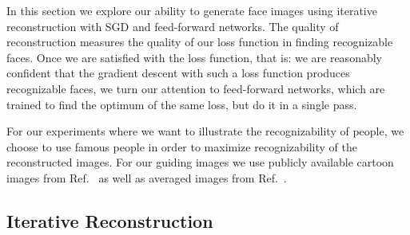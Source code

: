 \documentclass{article}
\newcommand{\Ref}[1]{Ref.~\citenum{#1}}
\begin{document}
  In this section we explore our ability to generate face images using iterative reconstruction with SGD and feed-forward networks.
  The quality of reconstruction measures the quality of our loss function in finding recognizable faces.
  Once we are satisfied with the loss function, that is: we are reasonably confident that the gradient
  descent with such a loss function produces recognizable faces, we turn our attention to feed-forward networks, which are trained to find the optimum of the same loss, but do it in a single pass.

  For our experiments where we want to illustrate the recognizability of people, we choose to use famous people in order to maximize recognizability of the reconstructed images.
  For our guiding images we use publicly available cartoon images from \Ref{public-domain-vectors} as well as averaged images from \Ref{face-research-org}.

  \subsection{Iterative Reconstruction}
\end{document}
